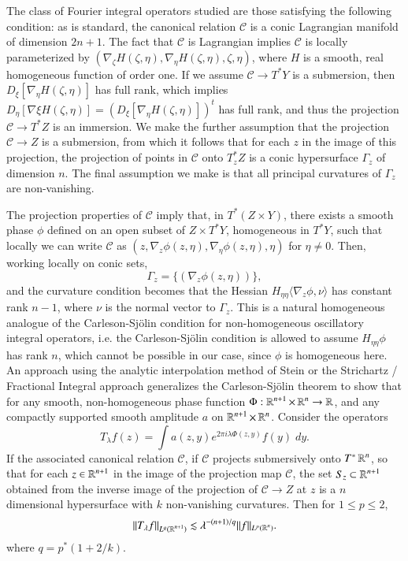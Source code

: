 The class of Fourier integral operators studied are those satisfying the following condition: as is standard, the canonical relation $\mathcal{C}$ is a conic Lagrangian manifold of dimension $2n + 1$. The fact that $\mathcal{C}$ is Lagrangian implies $\mathcal{C}$ is locally parameterized by $(\nabla_\zeta H(\zeta, \eta), \nabla_\eta H(\zeta, \eta),\zeta,\eta)$, where $H$ is a smooth, real homogeneous function of order one. If we assume $\mathcal{C} \to T^* Y$ is a submersion, then $D_\xi [\nabla_\eta H(\zeta,\eta)]$ has full rank, which implies $D_\eta [\nabla \xi H(\zeta, \eta)] = (D_\xi [\nabla_\eta H(\zeta, \eta)])^t$ has full rank, and thus the projection $\mathcal{C} \to T^* Z$ is an immersion. We make the further assumption that the projection $\mathcal{C} \to Z$ is a submersion, from which it follows that for each $z$ in the image of this projection, the projection of points in $\mathcal{C}$ onto $T^*_z Z$ is a conic hypersurface $\Gamma_z$ of dimension $n$. The final assumption we make is that all principal curvatures of $\Gamma_z$ are non-vanishing.

\begin{remark}
    The projection properties of $\mathcal{C}$ imply that, in $T^* (Z \times Y)$, there exists a smooth phase $\phi$ defined on an open subset of $Z \times T^* Y$, homogeneous in $T^* Y$, such that locally we can write $\mathcal{C}$ as $(z, \nabla_z \phi(z,\eta), \nabla_\eta \phi(z,\eta), \eta)$ for $\eta \neq 0$. Then, working locally on conic sets,
    \[ \Gamma_z = \{ (\nabla_z \phi(z,\eta)) \}, \]
    and the curvature condition becomes that the Hessian $H_{\eta \eta} \langle \nabla_z \phi, \nu \rangle$ has constant rank $n-1$, where $\nu$ is the normal vector to $\Gamma_z$. This is a natural homogeneous analogue of the Carleson-Sj\"{o}lin condition for non-homogeneous oscillatory integral operators, i.e. the Carleson-Sj\"{o}lin condition is allowed to assume $H_{\eta \eta} \phi$ has rank $n$, which cannot be possible in our case, since $\phi$ is homogeneous here. An approach using the analytic interpolation method of Stein or the Strichartz / Fractional Integral approach generalizes the Carleson-Sj\"{o}lin theorem to show that for any smooth, non-homogeneous phase function $\Phi: \operatorname{\mathbb{R}}^{n+1} \times \operatorname{\mathbb{R}}^n \to \operatorname{\mathbb{R}}$, and any compactly supported smooth amplitude $a$ on $\operatorname{\mathbb{R}}^{n+1} \times \operatorname{\mathbb{R}}^n$. Consider the operators
    \[ T_\lambda f(z) = \int a(z,y) e^{2 \pi i \lambda \Phi(z,y)} f(y)\; dy. \]
    If the associated canonical relation $\mathcal{C}$, if $\mathcal{C}$ projects submersively onto $T^* \operatorname{\mathbb{R}}^n$, so that for each $z \in \operatorname{\mathbb{R}}^{n+1}$ in the image of the projection map $\mathcal{C}$, the set $S_z \subset \operatorname{\mathbb{R}}^{n+1}$ obtained from the inverse image of the projection of $\mathcal{C} \to Z$ at $z$ is a $n$ dimensional hypersurface with $k$ non-vanishing curvatures. Then for $1 \leq p \leq 2$,
    \[ \| T_\lambda f \|_{L^q(\operatorname{\mathbb{R}}^{n+1})} \lesssim \lambda^{-(n+1)/q} \| f \|_{L^p(\operatorname{\mathbb{R}}^n)}. \]
    where $q = p^*(1 + 2/k)$.
\end{remark}


